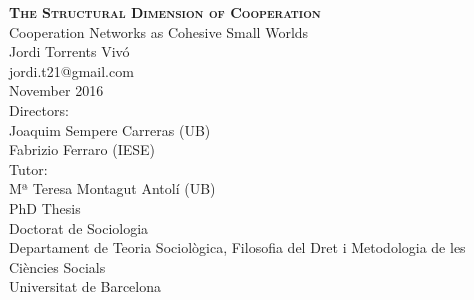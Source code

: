 \begin{titlingpage}
\begin{center}
{\HUGE \textsc{\textbf{The Structural Dimension of Cooperation}}}\\[1cm]
{\LARGE Cooperation Networks as Cohesive Small Worlds}\\[2cm]
{\Large Jordi Torrents Vivó} \\
{\large jordi.t21@gmail.com}\\[1cm]
{\Large November 2016}\\[4cm]
{\large Directors:} \\[0.2cm]
{\Large Joaquim Sempere Carreras (UB)} \\[0.2cm]
{\Large Fabrizio Ferraro (IESE)} \\[0.5cm]
{\large Tutor:} \\[0.2cm]
{\Large Mª Teresa Montagut Antolí (UB)} \\[1.5cm]
{\LARGE PhD Thesis}\\[0.5cm]
{\LARGE Doctorat de Sociologia}\\[1cm]
{\Large Departament de Teoria Sociològica, Filosofia del Dret i Metodologia de les Ciències Socials} \\[0.5cm]
{\LARGE Universitat de Barcelona}\\
\end{center}
\end{titlingpage}
\cleardoublepage
